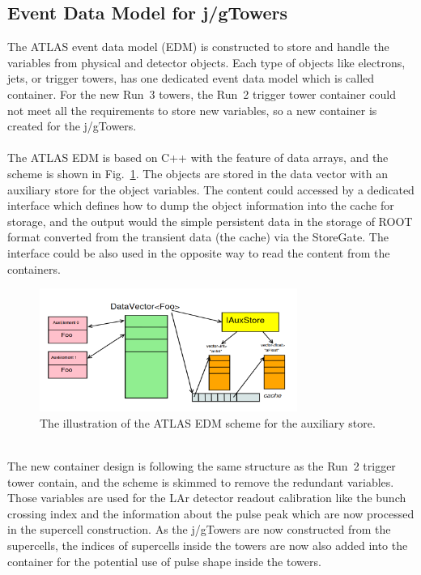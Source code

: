 \subsection{Event Data Model for j/gTowers}
The ATLAS event data model\cite{Buckley:2015tjh} (EDM) is constructed to store and handle the variables from physical and detector objects. Each type of objects like electrons, jets, or trigger towers, has one dedicated event data model which is called container. For the new Run~3 towers, the Run~2 trigger tower container could not meet all the requirements to store new variables, so a new container is created for the j/gTowers.
\\
\\The ATLAS EDM is based on C++ with the feature of data arrays, and the scheme is shown in Fig.~\ref{Fig:edm}. The objects are stored in the data vector with an auxiliary store for the object variables. The content could accessed by a dedicated interface which defines how to dump the object information into the cache for storage, and the output would the simple persistent data in the storage of ROOT format converted from the transient data (the cache) via the StoreGate\cite{Calafiura:2003gf}. The interface could be also used in the opposite way to read the content from the containers.  
\begin{figure}[!h]                
	\includegraphics[width=0.75\textwidth]{Chapter6/EDM.png}
	\begin{center}
		\caption{The illustration of the ATLAS EDM scheme for the auxiliary store\cite{Buckley:2015tjh}.}
		\label{Fig:edm}            
	\end{center}
\end{figure}
\noindent
\\The new container design is following the same structure as the Run~2 trigger tower contain, and the scheme is skimmed to remove the redundant variables. Those variables are used for the LAr detector readout calibration like the bunch crossing index and the information about the pulse peak which are now processed in the supercell construction. As the j/gTowers are now constructed from the supercells, the indices of supercells inside the towers are now also added into the container for the potential use of pulse shape inside the towers. 
